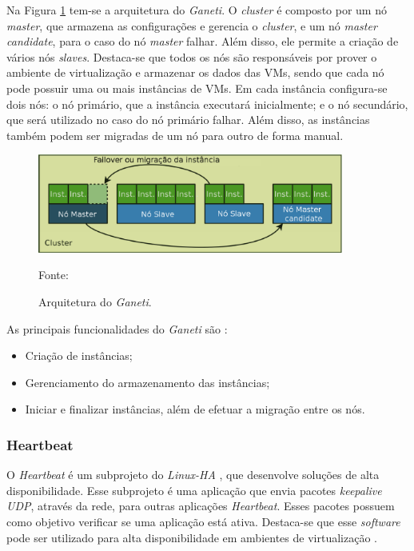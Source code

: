 Na Figura \ref{fig:ganeti_arquitetura} tem-se a arquitetura do \textit{Ganeti}. O \textit{cluster} é composto por um nó \textit{master}, que 
armazena as configurações e gerencia o \textit{cluster}, e um nó \textit{master candidate}, para o caso do nó \textit{master} falhar. 
Além disso, ele permite a criação de vários nós \textit{slaves}. Destaca-se que todos os nós são responsáveis por prover o ambiente de 
virtualização e armazenar os dados das \acp{VM}, sendo que cada nó pode possuir uma ou mais instâncias de \acp{VM}. Em cada instância 
configura-se dois nós: o nó primário, que a instância executará inicialmente; e o nó secundário, que será utilizado no caso do nó primário falhar.
Além disso, as instâncias também podem ser migradas de um nó para outro de forma manual. 

\begin{figure}[h!]
 \centering
 \includegraphics[width=380px]{img/ganeti_arquitetura.eps}
 \caption{Arquitetura do \textit{Ganeti}.}
 Fonte: \citet{carvalho2011}
 \label{fig:ganeti_arquitetura}
\end{figure}

\newpage
As principais funcionalidades do \textit{Ganeti} são \cite{ganeti}:
\begin{itemize}
 \item Criação de instâncias;
 \item Gerenciamento do armazenamento das instâncias;
 \item Iniciar e finalizar instâncias, além de efetuar a migração entre os nós.
\end{itemize}


\subsubsection{Heartbeat}
\label{section:heartbeat}
O \textit{Heartbeat} é um subprojeto do \textit{Linux-HA} \cite{linuxha}, que desenvolve soluções de alta disponibilidade.
Esse subprojeto é uma aplicação que envia pacotes \textit{keepalive \ac{UDP}}, através da rede, para outras aplicações \textit{Heartbeat}. 
Esses pacotes possuem como objetivo verificar se uma aplicação está ativa.
Destaca-se que esse \textit{software} pode ser utilizado para alta disponibilidade em ambientes de virtualização \cite{reis2009}.

